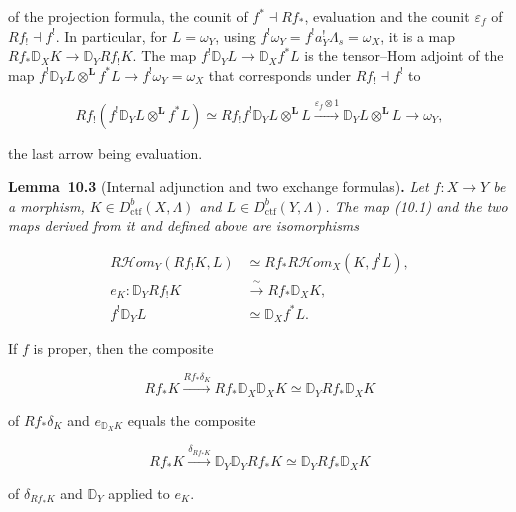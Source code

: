 \documentclass[11pt]{article}
\newenvironment{bpstatement}[2]{\par\addvspace{0.6\baselineskip}\noindent\textbf{#1}#2\textbf{.}\enspace\ignorespaces}
  {\par\addvspace{0.4\baselineskip}}
\newenvironment{bpstatementit}[2]{\begin{bpstatement}{#1}{#2}\itshape\ignorespaces}{\end{bpstatement}}
\providecommand{\cHom}{}\renewcommand{\cHom}{R\mathcal{H}\!om}
\begin{document}
of the projection formula, the counit of \(f^*\dashv Rf_*\), evaluation and the counit \(\varepsilon_f\) of \(Rf_!\dashv f^!\). In particular, for \(L=\omega_Y\), using \(f^!\omega_Y=f^!a_Y^!\Lambda_s=\omega_X\), it is a map \(Rf_*\mathbb D_XK\to\mathbb D_YRf_!K\). The map \(f^!\mathbb D_YL\to\mathbb D_Xf^*L\) is the tensor–Hom adjoint of the map \(f^!\mathbb D_YL\otimes^{\mathbf L}f^*L\to f^!\omega_Y=\omega_X\) that corresponds under \(Rf_!\dashv f^!\) to

\[
Rf_!(f^!\mathbb D_YL\otimes^{\mathbf L}f^*L)
\simeq Rf_!f^!\mathbb D_YL\otimes^{\mathbf L}L
\xrightarrow{\varepsilon_f\otimes1}\mathbb D_YL\otimes^{\mathbf L}L
\longrightarrow\omega_Y,
\]

the last arrow being evaluation.

\label{bp10}%
\begin{bpstatementit}{Lemma~10.3}{ (Internal adjunction and two exchange formulas)}
Let \(f:X\to Y\) be a morphism, \(K\in D^b_{\mathrm{ctf}}(X,\Lambda)\) and \(L\in D^b_{\mathrm{ctf}}(Y,\Lambda)\). The map (10.1) and the two maps derived from it and defined above are isomorphisms

\begin{align*}
\cHom_Y(Rf_!K,L)&\simeq
Rf_*\cHom_X(K,f^!L),\tag{10.2}\\
e_K:\mathbb D_YRf_!K&\xrightarrow{\ \sim\ } Rf_*\mathbb D_XK,
\tag{10.3}\\
f^!\mathbb D_YL&\simeq\mathbb D_Xf^*L.
\tag{10.4}\end{align*}

If \(f\) is proper, then the composite

\[
Rf_*K\xrightarrow{Rf_*\delta_K}Rf_*\mathbb D_X\mathbb D_XK
\simeq\mathbb D_YRf_*\mathbb D_XK
\]

of \(Rf_*\delta_K\) and \(e_{\mathbb D_XK}\) equals the composite

\[
Rf_*K\xrightarrow{\delta_{Rf_*K}}\mathbb D_Y\mathbb D_YRf_*K
\simeq\mathbb D_YRf_*\mathbb D_XK
\]

of \(\delta_{Rf_*K}\) and \(\mathbb D_Y\) applied to \(e_K\).
\end{bpstatementit}
\end{document}

